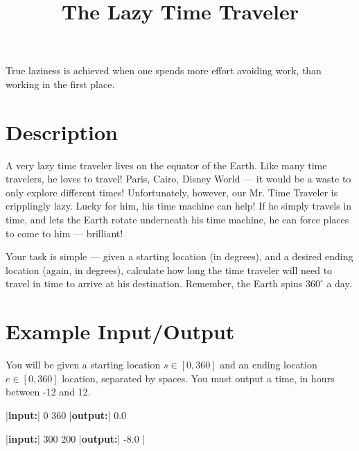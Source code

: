 \documentclass{../codeproblem}
\begin{document}
\title{The Lazy Time Traveler}

\begin{flavor}
  True laziness is achieved when one spends more effort avoiding work,
  than working in the first place.
\end{flavor}

\section*{Description}
A very lazy time traveler lives on the equator of the Earth. Like many
time travelers, he loves to travel! Paris, Cairo, Disney World --- it
would be a waste to only explore different times! Unfortunately,
however, our Mr. Time Traveler is cripplingly lazy. Lucky for him, his
time machine can help! If he simply travels in time, and lets the
Earth rotate underneath his time machine, he can force places to come
to him --- brilliant!

Your task is simple --- given a starting location (in degrees), and a
desired ending location (again, in degrees), calculate how long the
time traveler will need to travel in time to arrive at his
destination. Remember, the Earth spins $360^\circ$ a day.

\section*{Example Input/Output}

You will be given a starting location $s \in [0, 360]$ and an ending
location $e \in [0, 360]$ location, separated by spaces. You must
output a time, in hours between -12 and 12.

\begin{example}
|\textbf{input:}| 0 360
|\textbf{output:}| 0.0

|\textbf{input:}| 300 200
|\textbf{output:}| -8.0
|\end{example}
\end{document}
